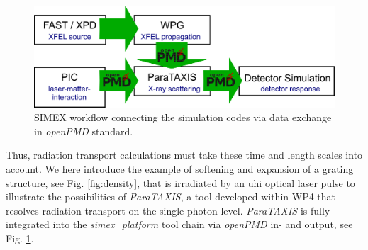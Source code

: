 %
  \begin{figure}[ht]
    \centering
    \includegraphics[width=.85\linewidth]{figures/simex_workflow_v2.png}
    \caption{
      SIMEX workflow connecting the simulation codes via data exchange in \textit{openPMD} standard.
    }
    \label{fig:workflows}
  \end{figure}
%
Thus, radiation transport calculations must take these time and length scales
into account. We here introduce the example of softening and expansion of a
grating structure, see Fig. \ref{fig:density},  that is irradiated by an \gls{uhi}
optical laser pulse to illustrate the possibilities of \textit{ParaTAXIS}, a tool
developed within WP4 that resolves radiation transport on the single photon
level. \textit{ParaTAXIS} is fully integrated into the \textit{simex\_platform} tool chain via
\textit{openPMD} \cite{Huebl2017} in- and output, see Fig. \ref{fig:workflows}.


